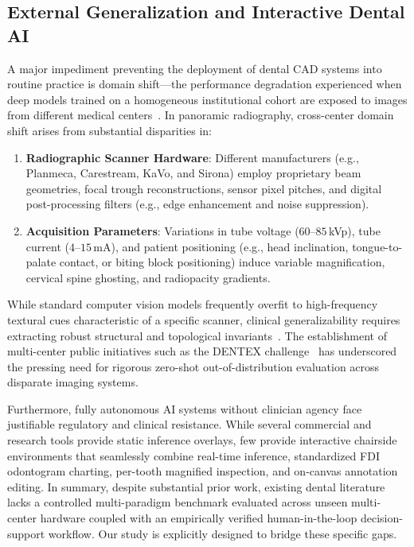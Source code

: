 \documentclass[10pt,journal,compsoc]{IEEEtran}
\begin{document}
\subsection{External Generalization and Interactive Dental AI}
A major impediment preventing the deployment of dental CAD systems into routine practice is domain shift—the performance degradation experienced when deep models trained on a homogeneous institutional cohort are exposed to images from different medical centers~\cite{dentex2023,maganur2024}. In panoramic radiography, cross-center domain shift arises from substantial disparities in:
\begin{enumerate}
    \item \textbf{Radiographic Scanner Hardware}: Different manufacturers (e.g., Planmeca, Carestream, KaVo, and Sirona) employ proprietary beam geometries, focal trough reconstructions, sensor pixel pitches, and digital post-processing filters (e.g., edge enhancement and noise suppression).
    \item \textbf{Acquisition Parameters}: Variations in tube voltage ($60\text{--}85$\,kVp), tube current ($4\text{--}15$\,mA), and patient positioning (e.g., head inclination, tongue-to-palate contact, or biting block positioning) induce variable magnification, cervical spine ghosting, and radiopacity gradients.
\end{enumerate}
While standard computer vision models frequently overfit to high-frequency textural cues characteristic of a specific scanner, clinical generalizability requires extracting robust structural and topological invariants~\cite{buttner2024}. The establishment of multi-center public initiatives such as the DENTEX challenge~\cite{dentex2023} has underscored the pressing need for rigorous zero-shot out-of-distribution evaluation across disparate imaging systems.

Furthermore, fully autonomous AI systems without clinician agency face justifiable regulatory and clinical resistance. While several commercial and research tools provide static inference overlays, few provide interactive chairside environments that seamlessly combine real-time inference, standardized FDI odontogram charting, per-tooth magnified inspection, and on-canvas annotation editing. In summary, despite substantial prior work, existing dental literature lacks a controlled multi-paradigm benchmark evaluated across unseen multi-center hardware coupled with an empirically verified human-in-the-loop decision-support workflow. Our study is explicitly designed to bridge these specific gaps.
\end{document}
